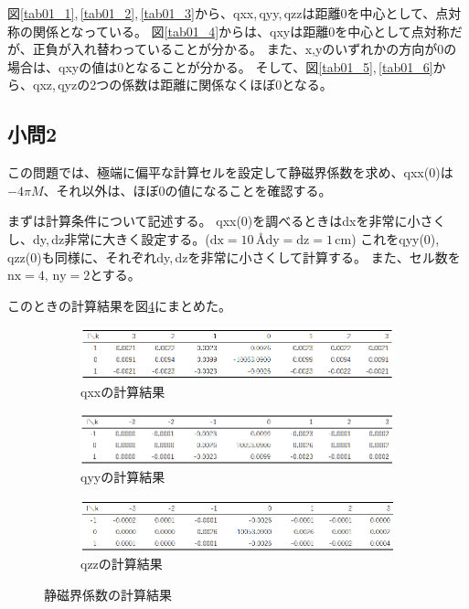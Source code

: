 \documentclass{jsarticle}
\begin{document}
図\ref{tab01_1},\,\ref{tab01_2},\,\ref{tab01_3}から、qxx,\,qyy,\,qzzは距離0を中心として、点対称の関係となっている。
図\ref{tab01_4}からは、qxyは距離0を中心として点対称だが、正負が入れ替わっていることが分かる。
また、x,yのいずれかの方向が0の場合は、qxyの値は0となることが分かる。
そして、図\ref{tab01_5},\,\ref{tab01_6}から、qxz,\,qyzの2つの係数は距離に関係なくほぼ0となる。

\subsection{小問2}
この問題では、極端に偏平な計算セルを設定して静磁界係数を求め、qxx(0)は$-4\pi M$、それ以外は、ほぼ0の値になることを確認する。

まずは計算条件について記述する。
qxx(0)を調べるときはdxを非常に小さくし、dy,\,dz非常に大きく設定する。($\mathrm{dx}=10$\,\AA$\mathrm{dy}=\mathrm{dz}=1\,\mathrm{cm}$)
これをqyy(0),\,qzz(0)も同様に、それぞれdy,\,dzを非常に小さくして計算する。
また、セル数を$\mathrm{nx}=4,\,\mathrm{ny}=2$とする。

このときの計算結果を図\ref{tab02}にまとめた。
\begin{figure}[H]
	\centering
	\begin{subfigure}{0.7\columnwidth}
		\centering
		\includegraphics[width=\columnwidth]{tab02_1.eps}
		\caption{qxxの計算結果}
		\label{tab02_1}
	\end{subfigure}
	\begin{subfigure}{0.7\columnwidth}
		\centering
		\includegraphics[width=\columnwidth]{tab02_2.eps}
		\caption{qyyの計算結果}
		\label{tab02_2}
	\end{subfigure}
	\begin{subfigure}{0.7\columnwidth}
		\centering
		\includegraphics[width=\columnwidth]{tab02_3.eps}
		\caption{qzzの計算結果}
		\label{tab02_3}
	\end{subfigure}
	\caption{静磁界係数の計算結果}
	\label{tab02}
\end{figure}
\end{document}
